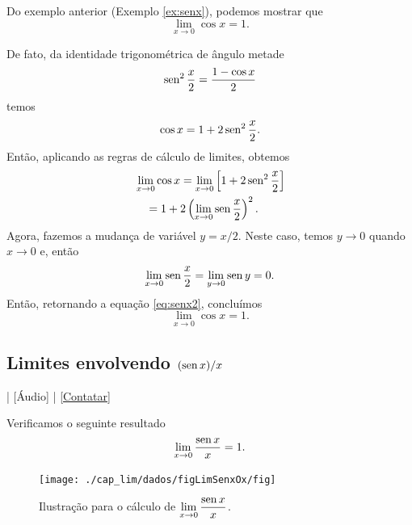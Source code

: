 \begin{obs}
  Do exemplo anterior (Exemplo \ref{ex:senx}), podemos mostrar que
\begin{equation}
  \lim_{x\to 0} \cos x = 1.
\end{equation}

De fato, da identidade trigonométrica de ângulo metade
\begin{equation}
  \operatorname{sen}^2 \frac{x}{2} = \frac{1 - \cos x}{2}
\end{equation}
temos
\begin{equation}
  \cos x = 1 + 2\operatorname{sen}^2 \frac{x}{2}.
\end{equation}
Então, aplicando as regras de cálculo de limites, obtemos
\begin{align}
  & \lim_{x\to 0} \cos x = \lim_{x\to 0} \left[1 + 2\operatorname{sen}^2 \frac{x}{2}\right] \\
  & \text{}\quad = 1 + 2\left(\lim_{x\to 0} \operatorname{sen} \frac{x}{2}\right)^2.\label{eq:senx2}
\end{align}
Agora, fazemos a mudança de variável $y = x/2$. Neste caso, temos $y\to 0$ quando $x\to 0$ e, então
\begin{equation}
  \lim_{x\to 0} \operatorname{sen} \frac{x}{2} = \lim_{y\to 0} \operatorname{sen} y = 0.
\end{equation}
Então, retornando a equação \eqref{eq:senx2}, concluímos
\begin{equation}
  \lim_{x\to 0} \cos x = 1.
\end{equation}
\end{obs}

\subsection{Limites envolvendo $(\operatorname{sen} x)/x$}\label{sec:lim_senx_x}

\begin{flushright}
  [Vídeo] | [Áudio] | \href{https://phkonzen.github.io/notas/contato.html}{[Contatar]}
\end{flushright}

Verificamos o seguinte resultado
\begin{equation}\label{eq:lim_senx_x}
  \lim_{x\to 0} \frac{\operatorname{sen} x}{x} = 1.
\end{equation}

\begin{figure}[H]
  \centering
  \texttt{[image: ./cap\_lim/dados/figLimSenxOx/fig]}
  \caption{Ilustração para o cálculo de $\displaystyle\lim_{x\to 0}\frac{\operatorname{sen} x}{x}$.}
  \label{fig:limSenxOx}
\end{figure}

